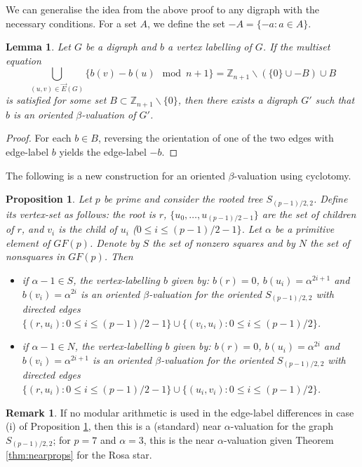 \documentclass[12pt, a4paper]{article}
\newtheorem{proposition}[theorem]{Proposition}
\newtheorem{lemma}[theorem]{Lemma}
\theoremstyle{definition}
\newtheorem{remark}[theorem]{Remark}
\begin{document}
We can generalise the idea from the above proof to any digraph with the necessary conditions. For a set $A$, we define the set $-A=\{-a: a\in A\}$. 

\begin{lemma}\label{selfflip}
    Let $G$ be a digraph and $b$ a vertex labelling of $G$.  If the multiset equation
    \[\bigcup_{(u,v) \in \overrightarrow{E}(G)} \{ b(v)-b(u) \mod n+1\} = \mathbb{Z}_{n+1}\backslash(\{0\}\cup -B) \cup B\] 
    is satisfied for some set $B \subset \mathbb{Z}_{n+1}\backslash\{0\}$, then there exists a digraph $G'$ such that $b$ is an oriented $\beta$-valuation of $G'$. 
\end{lemma}
\begin{proof}
For each $b \in B$, reversing the orientation of one of the two edges with edge-label $b$ yields the edge-label $-b$.
\end{proof}

The following is a new construction for an oriented $\beta$-valuation using cyclotomy.
\begin{proposition}\label{prop:orientedcyclotomic}
Let $p$ be prime and consider the rooted tree $S_{(p-1)/2,2}$.  Define its vertex-set as follows: the root is $r$, $\{u_0,\ldots,u_{(p-1)/2-1}\}$ are the set of children of $r$, and $v_i$ is the child of $u_i$ ($0 \leq i \leq (p-1)/2-1\}$.   Let $\alpha$ be a primitive element of $GF(p)$.  Denote by $S$ the set of nonzero squares and by $N$ the set of nonsquares in $GF(p)$. Then
\begin{itemize}
\item[(i)] if $\alpha-1 \in S$, the vertex-labelling $b$ given by: $b(r)=0$, $b(u_i)=\alpha^{2i+1}$ and $b(v_i)=\alpha^{2i}$ is an oriented $\beta$-valuation for the oriented $S_{(p-1)/2,2}$ with directed edges $\{(r,u_i): 0 \leq i \leq (p-1)/2-1\} \cup \{(v_i,u_i): 0 \leq i \leq (p-1)/2\}$.
\item[(ii)] if $\alpha-1 \in N$, the vertex-labelling $b$ given by: $b(r)=0$, $b(u_i)=\alpha^{2i}$ and $b(v_i)=\alpha^{2i+1}$ is an oriented $\beta$-valuation for the oriented $S_{(p-1)/2,2}$ with directed edges $\{(r,u_i): 0 \leq i \leq (p-1)/2-1\} \cup \{(u_i,v_i): 0 \leq i \leq (p-1)/2\}$.
\end{itemize}
\end{proposition}

\begin{remark}
If no modular arithmetic is used in the edge-label differences in case (i) of Proposition \ref{prop:orientedcyclotomic}, then this is a (standard) near $\alpha$-valuation for the graph $S_{(p-1)/2,2}$; for $p=7$ and $\alpha=3$, this is the near $\alpha$-valuation given Theorem \ref{thm:nearprops} for the Rosa star.
\end{remark}
\end{document}
